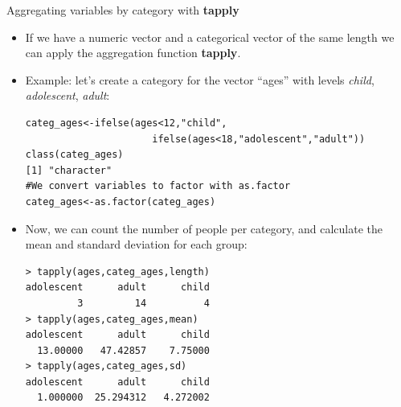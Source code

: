 \documentclass[handout]{beamer}
\begin{document}
\begin{frame}[fragile]{Aggregating variables by category with \textbf{tapply}}
\scriptsize{
\begin{itemize}
 \item If we have a numeric vector and a categorical vector of the same length we can apply the aggregation function \textbf{tapply}.
 \item Example: let's create a category for the vector ``ages'' with levels \emph{child}, \emph{adolescent}, \emph{adult}:
 \begin{verbatim}
categ_ages<-ifelse(ages<12,"child",
                      ifelse(ages<18,"adolescent","adult"))
class(categ_ages)
[1] "character"
#We convert variables to factor with as.factor
categ_ages<-as.factor(categ_ages)
 \end{verbatim}

 \item Now, we can count the number of people per category, and calculate the mean and standard deviation for each group:
\begin{verbatim}
> tapply(ages,categ_ages,length)
adolescent      adult      child 
         3         14          4 
> tapply(ages,categ_ages,mean)
adolescent      adult      child 
  13.00000   47.42857    7.75000 
> tapply(ages,categ_ages,sd)
adolescent      adult      child 
  1.000000  25.294312   4.272002  
\end{verbatim}

 
\end{itemize}



}
\end{frame}
\end{document}
